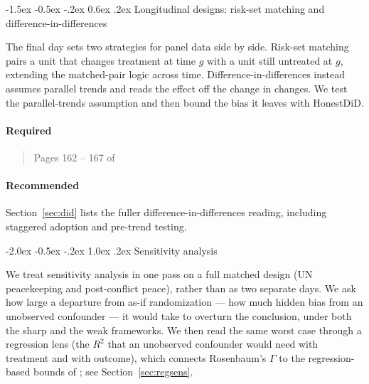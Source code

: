 \documentclass[12pt]{article}
\makeatletter
\renewcommand\section{\@startsection{section}{1}{\z@}%
  {-2.0ex \@plus -0.5ex \@minus -.2ex}%
  {1.0ex \@plus .2ex}%
  {\normalfont\Large\bfseries}}
\renewcommand\subsection{\@startsection{subsection}{2}{\z@}%
  {-1.5ex \@plus -0.5ex \@minus -.2ex}%
  {0.6ex \@plus .2ex}%
  {\normalfont\large\bfseries}}
\makeatother
\begin{document}
\subsection{Longitudinal designs: risk-set matching and difference-in-differences}\label{sec:long}

The final day sets two strategies for panel data side by side. Risk-set matching pairs a unit that changes treatment at time $g$ with a unit still untreated at $g$, extending the matched-pair logic across time. Difference-in-differences instead assumes parallel trends and reads the effect off the change in changes. We test the parallel-trends assumption and then bound the bias it leaves with HonestDiD.

\paragraph*{Required}

\begin{verse}  \end{verse}

\begin{verse} Pages 162 -- 167 of  \end{verse}

\begin{verse}  \end{verse}

\paragraph*{Recommended}

\begin{verse}  \end{verse}

\begin{verse}  \end{verse}

Section~\ref{sec:did} lists the fuller difference-in-differences reading, including staggered adoption and pre-trend testing.

\section{Sensitivity analysis}

We treat sensitivity analysis in one pass on a full matched design (UN peacekeeping and post-conflict peace), rather than as two separate days. We ask how large a departure from as-if randomization --- how much hidden bias from an unobserved confounder --- it would take to overturn the conclusion, under both the sharp and the weak frameworks. We then read the same worst case through a regression lens (the $R^2$ that an unobserved confounder would need with treatment and with outcome), which connects Rosenbaum's $\Gamma$ to the regression-based bounds of \textcite{cinellihazlett2020}; see Section~\ref{sec:regsens}.
\end{document}
